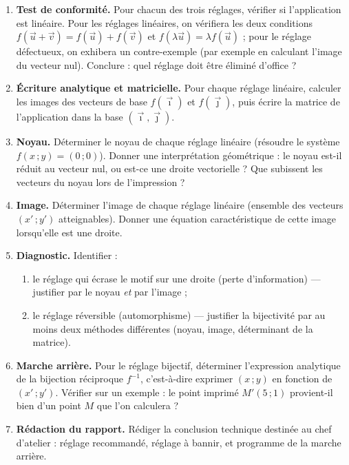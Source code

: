 \documentclass[11pt]{article}
\newcounter{popsec}
\newcounter{popsub}
\newcommand{\courssub}[1]{%
  \stepcounter{popsub}%
  \par\vspace{9pt}\noindent{\popxbold\fontsize{11.5}{13}\selectfont\color{popink}{\color{poporange}\thepopsec.\thepopsub}\hspace{6pt}#1}\par\nopagebreak\vspace{4pt}
}
\begin{document}
\begin{enumerate}
\item \textbf{Test de conformité.} Pour chacun des trois réglages, vérifier si l'application est linéaire. Pour les réglages linéaires, on vérifiera les deux conditions $f(\vec{u}+\vec{v}) = f(\vec{u}) + f(\vec{v})$ et $f(\lambda \vec{u}) = \lambda f(\vec{u})$ ; pour le réglage défectueux, on exhibera un contre-exemple (par exemple en calculant l'image du vecteur nul). Conclure : quel réglage doit être éliminé d'office ?
\item \textbf{Écriture analytique et matricielle.} Pour chaque réglage linéaire, calculer les images des vecteurs de base $f(\vec{\imath})$ et $f(\vec{\jmath})$, puis écrire la matrice de l'application dans la base $(\vec{\imath},\vec{\jmath})$.
\item \textbf{Noyau.} Déterminer le noyau de chaque réglage linéaire (résoudre le système $f(x\,;y) = (0\,;0)$). Donner une interprétation géométrique : le noyau est-il réduit au vecteur nul, ou est-ce une droite vectorielle ? Que subissent les vecteurs du noyau lors de l'impression ?
\item \textbf{Image.} Déterminer l'image de chaque réglage linéaire (ensemble des vecteurs $(x'\,;y')$ atteignables). Donner une équation caractéristique de cette image lorsqu'elle est une droite.
\item \textbf{Diagnostic.} Identifier :
\begin{enumerate}
\item le réglage qui \og écrase \fg{} le motif sur une droite (perte d'information) — justifier par le noyau \emph{et} par l'image ;
\item le réglage réversible (automorphisme) — justifier la bijectivité par au moins deux méthodes différentes (noyau, image, déterminant de la matrice).
\end{enumerate}
\item \textbf{Marche arrière.} Pour le réglage bijectif, déterminer l'expression analytique de la bijection réciproque $f^{-1}$, c'est-à-dire exprimer $(x\,;y)$ en fonction de $(x'\,;y')$. Vérifier sur un exemple : le point imprimé $M'(5\,;1)$ provient-il bien d'un point $M$ que l'on calculera ?
\item \textbf{Rédaction du rapport.} Rédiger la conclusion technique destinée au chef d'atelier : réglage recommandé, réglage à bannir, et programme de la marche arrière.
\end{enumerate}

\courssub{Démarche et corrigé commenté}
\end{document}
